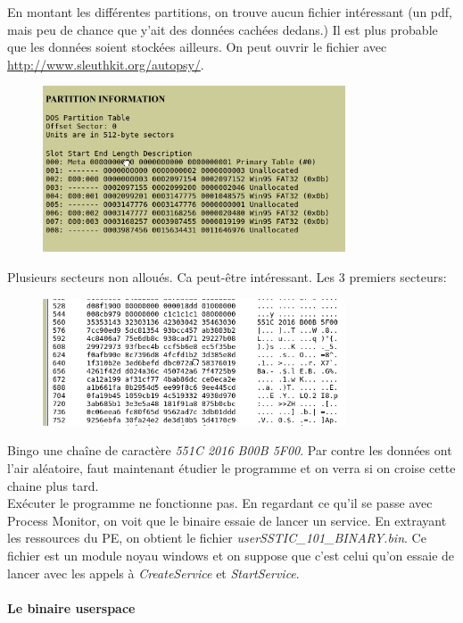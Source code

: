 \documentclass[14pt]{article}
\begin{document}
En montant les différentes partitions, on trouve aucun fichier intéressant (un pdf, mais peu de chance que y'ait des données cachées dedans.) Il est plus probable que les données soient stockées ailleurs.
On peut ouvrir le fichier avec \href{Autopsy}{http://www.sleuthkit.org/autopsy/}.

\begin{figure}[H]
\includegraphics[width=0.8\textwidth]{./imgs/usb_img_partitions.png}
\centering
\end{figure}
Plusieurs secteurs non alloués. Ca peut-être intéressant. Les 3 premiers secteurs:
\begin{figure}[H]
\includegraphics[width=0.8\textwidth]{./imgs/usb_img_data1.png}
\centering
\end{figure}

Bingo une chaîne de caractère {\em 551C 2016 B00B 5F00}. Par contre les données ont l'air aléatoire, faut maintenant étudier le programme et on verra si on croise cette chaine plus tard.\\

Exécuter le programme ne fonctionne pas. En regardant ce qu'il se passe avec Process Monitor, on voit que le binaire essaie de lancer un service. En extrayant les ressources du PE, on obtient le fichier {\em userSSTIC\_101\_BINARY.bin}. Ce fichier est un module noyau windows et on suppose que c'est celui qu'on essaie de lancer avec les appels à {\em CreateService} et {\em StartService}.

\paragraph{Le binaire userspace \\ }
\end{document}
